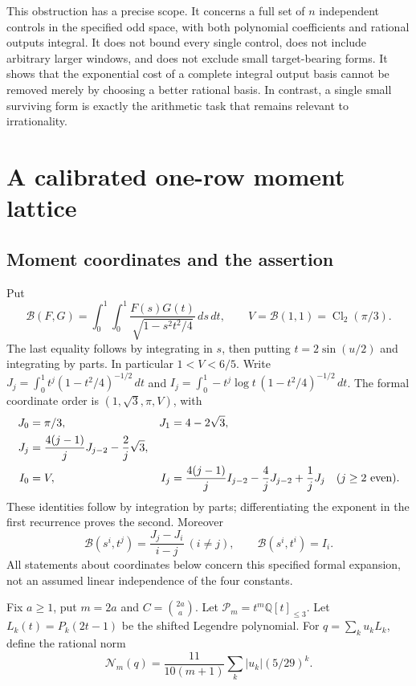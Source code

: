 \documentclass[11pt,a4paper]{article}
\numberwithin{equation}{section}
\theoremstyle{definition}\newtheorem{definition}[theorem]{Definition}
\theoremstyle{remark}\newtheorem{remark}[theorem]{Remark}
\newcommand{\B}{\mathcal B}\newcommand{\N}{\mathcal N}\newcommand{\M}{\mathcal M}
\begin{document}
This obstruction has a precise scope. It concerns a full set of $n$
independent controls in the specified odd space, with both polynomial
coefficients and rational outputs integral. It does not bound every
single control, does not include arbitrary larger windows, and does not
exclude small target-bearing forms. It shows that the exponential cost
of a complete integral output basis cannot be removed merely by choosing
a better rational basis. In contrast, a single small surviving form is
exactly the arithmetic task that remains relevant to irrationality.



\section{A calibrated one-row moment lattice}
\subsection{Moment coordinates and the assertion}
Put
\[
 \B(F,G)=\int_0^1\!\int_0^1
 \frac{F(s)G(t)}{\sqrt{1-s^2t^2/4}}\,ds\,dt,
 \qquad V=\B(1,1)=\operatorname{Cl}_2(\pi/3).
\]
The last equality follows by integrating in $s$, then putting
$t=2\sin(u/2)$ and integrating by parts. In particular $1<V<6/5$.
Write $J_j=\int_0^1t^j(1-t^2/4)^{-1/2}\,dt$ and
$I_j=\int_0^1-t^j\log t\,(1-t^2/4)^{-1/2}\,dt$.
The formal coordinate order is $(1,\sqrt3,\pi,V)$, with
\begin{align}
 J_0&=\pi/3,&J_1&=4-2\sqrt3,\notag\\
 J_j&=\frac{4(j-1)}jJ_{j-2}-\frac2j\sqrt3,\label{calbase:Jrec}\\
 I_0&=V,&I_j&=\frac{4(j-1)}jI_{j-2}
              -\frac4jJ_{j-2}+\frac1jJ_j\quad(j\ge2\text{ even}).\label{calbase:Irec}
\end{align}
These identities follow by integration by parts; differentiating the
exponent in the first recurrence proves the second. Moreover
\[
 \B(s^i,t^j)=\frac{J_j-J_i}{i-j}\ (i\ne j),\qquad
 \B(s^i,t^i)=I_i.
\]
All statements about coordinates below concern this specified formal
expansion, not an assumed linear independence of the four constants.

Fix $a\ge1$, put $m=2a$ and $C=\binom{2a}{a}$. Let
$\mathcal P_m=t^m\mathbb Q[t]_{\le3}$.
Let $L_k(t)=P_k(2t-1)$ be the shifted Legendre polynomial. For
$q=\sum_k u_kL_k$, define the rational norm
\begin{equation}
 \N_m(q)=\frac{11}{10(m+1)}\sum_k |u_k|(5/29)^k.
 \label{calbase:norm}
\end{equation}
\end{document}
